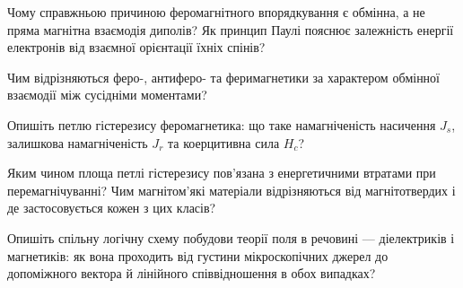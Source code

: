 \begin{Questions}
\begin{quizlist}
	\item Чому справжньою причиною феромагнітного впорядкування є обмінна, а не пряма магнітна взаємодія диполів? Як принцип Паулі пояснює залежність енергії електронів від взаємної орієнтації їхніх спінів?
	\item Чим відрізняються феро-, антиферо- та феримагнетики за характером обмінної взаємодії між сусідніми моментами?
	\item Опишіть петлю гістерезису феромагнетика: що таке намагніченість насичення $J_s$, залишкова намагніченість $J_r$ та коерцитивна сила $H_c$?
	\item Яким чином площа петлі гістерезису пов'язана з енергетичними втратами при перемагнічуванні? Чим магнітом'які матеріали відрізняються від магнітотвердих і де застосовується кожен з цих класів?
	\item Опишіть спільну логічну схему побудови теорії поля в речовині --- діелектриків і магнетиків: як вона проходить від густини мікроскопічних джерел до допоміжного вектора й лінійного співвідношення в обох випадках?
\end{quizlist}
\end{Questions}